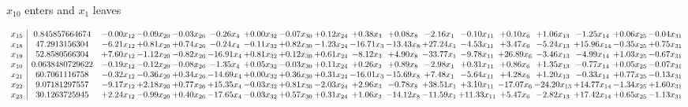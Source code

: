 \documentclass[9pt]{article}
\begin{document}
 $ x_{10} $ enters and $ x_{1} $ leaves 

 \[\begin{array}{c| c c@{\hskip 2pt} c@{\hskip 2pt} c@{\hskip 2pt} c@{\hskip 2pt} c@{\hskip 2pt} c@{\hskip 2pt} c@{\hskip 2pt} c@{\hskip 2pt} c@{\hskip 2pt} c@{\hskip 2pt} c@{\hskip 2pt} c@{\hskip 2pt} c@{\hskip 2pt} c@{\hskip 2pt} c@{\hskip 2pt} c@{\hskip 2pt} }
 x_{15}   &  0.845857664674 & -0.00 x_{12} & -0.09 x_{20} & -0.03 x_{26} & -0.26 x_{4} & +  0.00 x_{32} & -0.07 x_{30} & +  0.12 x_{24} & +  0.38 x_{3} & +  0.08 x_{8} & -2.16 x_{1} & -0.10 x_{11} & +  0.10 x_{6} & +  1.06 x_{13} & -1.25 x_{14} & +  0.06 x_{25} & -0.04 x_{31}\\
 x_{18}   &  47.2913156304 & -6.21 x_{12} & +  0.81 x_{20} & +  0.74 x_{26} & -0.24 x_{4} & -0.11 x_{32} & +  0.82 x_{30} & -1.23 x_{24} & -16.71 x_{3} & -13.43 x_{8} & + 27.24 x_{1} & -4.53 x_{11} & +  3.47 x_{6} & -5.24 x_{13} & + 15.96 x_{14} & -0.35 x_{25} & +  0.75 x_{31}\\
 x_{19}   &  52.8580566304 & +  7.60 x_{12} & -1.12 x_{20} & -0.82 x_{26} & -16.91 x_{4} & +  0.81 x_{32} & +  0.12 x_{30} & +  0.61 x_{24} & -8.12 x_{3} & +  4.90 x_{8} & -33.77 x_{1} & -9.78 x_{11} & + 26.89 x_{6} & -3.46 x_{13} & -4.99 x_{14} & +  1.03 x_{25} & -0.67 x_{31}\\
 x_{10}   &  0.0638480729622 & -0.19 x_{12} & -0.12 x_{20} & -0.08 x_{26} & -1.35 x_{4} & +  0.05 x_{32} & -0.03 x_{30} & +  0.11 x_{24} & +  0.26 x_{3} & +  0.89 x_{8} & -2.98 x_{1} & +  0.31 x_{11} & +  0.86 x_{6} & +  1.35 x_{13} & -0.77 x_{14} & +  0.05 x_{25} & -0.07 x_{31}\\
 x_{21}   &  60.7061116758 & -0.32 x_{12} & -0.36 x_{20} & +  0.34 x_{26} & -14.69 x_{4} & +  0.00 x_{32} & +  0.36 x_{30} & +  0.31 x_{24} & -16.01 x_{3} & -15.69 x_{8} & +  7.48 x_{1} & -5.64 x_{11} & +  4.28 x_{6} & +  1.20 x_{13} & -0.33 x_{14} & +  0.77 x_{25} & -0.13 x_{31}\\
 x_{22}   &  9.07181297557 & -9.17 x_{12} & +  2.18 x_{20} & +  0.77 x_{26} & + 15.35 x_{4} & -0.03 x_{32} & +  0.81 x_{30} & -2.03 x_{24} & +  2.96 x_{3} & -0.78 x_{8} & + 38.51 x_{1} & +  3.10 x_{11} & -17.07 x_{6} & -24.20 x_{13} & + 14.77 x_{14} & -1.34 x_{25} & +  1.60 x_{31}\\
 x_{23}   &  30.1263725945 & +  2.24 x_{12} & -0.99 x_{20} & +  0.40 x_{26} & -17.65 x_{4} & -0.03 x_{32} & +  0.57 x_{30} & +  0.31 x_{24} & +  1.06 x_{3} & -14.12 x_{8} & -11.59 x_{1} & + 11.33 x_{11} & +  5.47 x_{6} & -2.82 x_{13} & + 17.42 x_{14} & +  0.65 x_{25} & -1.13 x_{31}\\

\end{array}\]
\end{document}
